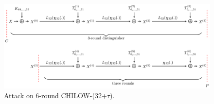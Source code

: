 \documentclass[a4paper]{llncs}
\begin{document}
\begin{figure}
	\centering
	\includegraphics[width=1\textwidth]{figures/chilow_fig_6R.pdf} %
	\caption{Attack on 6-round CHILOW-(32+$\tau$).}
	\label{fig:6R_attack} %
\end{figure}







\end{document}
